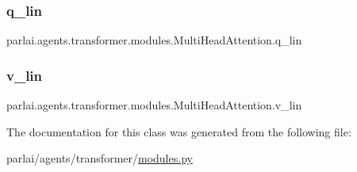 \subsubsection{\texorpdfstring{q\+\_\+lin}{q\_lin}}
{\footnotesize\ttfamily parlai.\+agents.\+transformer.\+modules.\+Multi\+Head\+Attention.\+q\+\_\+lin}

\mbox{\label{classparlai_1_1agents_1_1transformer_1_1modules_1_1MultiHeadAttention_a1b1c33915c80f894221dfd4f0a0a2896}} 
\subsubsection{\texorpdfstring{v\+\_\+lin}{v\_lin}}
{\footnotesize\ttfamily parlai.\+agents.\+transformer.\+modules.\+Multi\+Head\+Attention.\+v\+\_\+lin}



The documentation for this class was generated from the following file\+:\begin{DoxyCompactItemize}
\item 
parlai/agents/transformer/\hyperlink{parlai_2agents_2transformer_2modules_8py}{modules.\+py}\end{DoxyCompactItemize}
